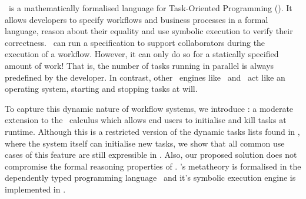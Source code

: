 %
%
\TOPHAT\ is a mathematically formalised language for Task-Oriented Programming (\TOP).
It allows developers to specify workflows and business processes in a formal language,
reason about their equality
and use symbolic execution to verify their correctness.
\TOPHAT\ can run a specification to support collaborators during the execution of a workflow.
However, it can only do so for a statically specified amount of work!
That is, the number of tasks running in parallel is always predefined by the developer.
In contrast, other \TOP\ engines like \ITASKS\ and \MTASKS\ act like an operating system,
starting and stopping tasks at will.

To capture this dynamic nature of workflow systems,
we introduce \DYNTOPHAT:
a moderate extension to the \TOPHAT\ calculus which allows end users to initialise and kill tasks at runtime.
Although this is a restricted version of the dynamic tasks lists found in \ITASKS,
where the system itself can initialise new tasks,
we show that all common use cases of this feature are still expressible in \DYNTOPHAT.
Also, our proposed solution does not compromise the formal reasoning properties of \TOPHAT.
\TOPHAT's metatheory is formalised in the dependently typed programming language \IDRIS\
and it's symbolic execution engine is implemented in \HASKELL.


